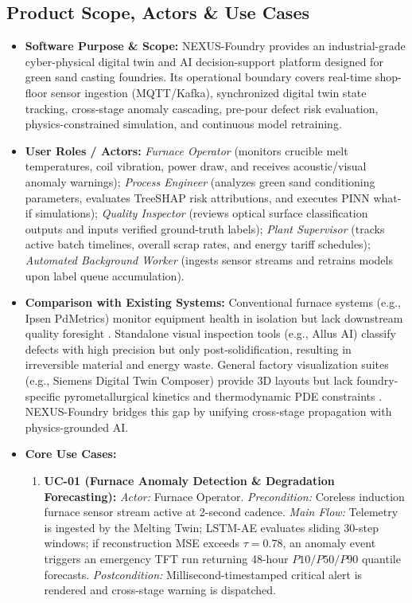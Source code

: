 \documentclass[11pt, a4paper]{article}
\begin{document}
\subsection{Product Scope, Actors \& Use Cases}
\begin{itemize}[noitemsep, topsep=2pt]
    \item \textbf{Software Purpose \& Scope:} NEXUS-Foundry provides an industrial-grade cyber-physical digital twin and AI decision-support platform designed for green sand casting foundries. Its operational boundary covers real-time shop-floor sensor ingestion (MQTT/Kafka), synchronized digital twin state tracking, cross-stage anomaly cascading, pre-pour defect risk evaluation, physics-constrained simulation, and continuous model retraining.
    \item \textbf{User Roles / Actors:} 
    \textit{Furnace Operator} (monitors crucible melt temperatures, coil vibration, power draw, and receives acoustic/visual anomaly warnings); 
    \textit{Process Engineer} (analyzes green sand conditioning parameters, evaluates TreeSHAP risk attributions, and executes PINN what-if simulations); 
    \textit{Quality Inspector} (reviews optical surface classification outputs and inputs verified ground-truth labels); 
    \textit{Plant Supervisor} (tracks active batch timelines, overall scrap rates, and energy tariff schedules); 
    \textit{Automated Background Worker} (ingests sensor streams and retrains models upon label queue accumulation).
    \item \textbf{Comparison with Existing Systems:} Conventional furnace systems (e.g., Ipsen PdMetrics) monitor equipment health in isolation but lack downstream quality foresight \cite{vijaykumar2025}. Standalone visual inspection tools (e.g., Allus AI) classify defects with high precision but only post-solidification, resulting in irreversible material and energy waste. General factory visualization suites (e.g., Siemens Digital Twin Composer) provide 3D layouts but lack foundry-specific pyrometallurgical kinetics and thermodynamic PDE constraints \cite{vanwyk2024, zhou2025}. NEXUS-Foundry bridges this gap by unifying cross-stage propagation with physics-grounded AI.
    \item \textbf{Core Use Cases:}
    \begin{enumerate}[noitemsep, topsep=2pt]
        \item \textbf{UC-01 (Furnace Anomaly Detection \& Degradation Forecasting):} \textit{Actor:} Furnace Operator. \textit{Precondition:} Coreless induction furnace sensor stream active at 2-second cadence. \textit{Main Flow:} Telemetry is ingested by the Melting Twin; LSTM-AE evaluates sliding 30-step windows; if reconstruction MSE exceeds $\tau = 0.78$, an anomaly event triggers an emergency TFT run returning 48-hour $P10/P50/P90$ quantile forecasts. \textit{Postcondition:} Millisecond-timestamped critical alert is rendered and cross-stage warning is dispatched.

\end{enumerate}
\end{itemize}
\end{document}
